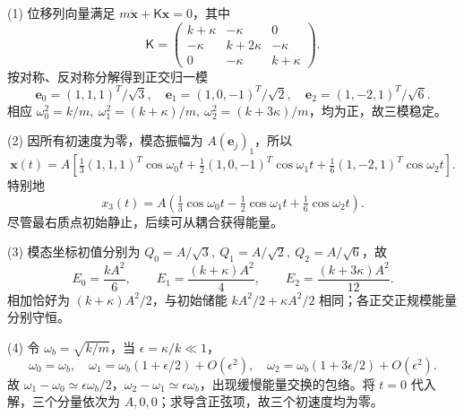 (1) 位移列向量满足 \(m\ddot{\boldsymbol x}+\mathsf K\boldsymbol x=0\)，其中
\[
\mathsf K=\begin{pmatrix}k+\kappa&-\kappa&0\\-\kappa&k+2\kappa&-\kappa\\0&-\kappa&k+\kappa\end{pmatrix}.
\]
按对称、反对称分解得到正交归一模
\[
\boldsymbol e_0=(1,1,1)^T/\sqrt3,\quad
\boldsymbol e_1=(1,0,-1)^T/\sqrt2,\quad
\boldsymbol e_2=(1,-2,1)^T/\sqrt6.
\]
相应 \(\omega_0^2=k/m,\ \omega_1^2=(k+\kappa)/m,\ \omega_2^2=(k+3\kappa)/m\)，均为正，故三模稳定。

(2) 因所有初速度为零，模态振幅为 \(A(\boldsymbol e_j)_1\)，所以
\[
\boldsymbol x(t)=A\left[\tfrac13(1,1,1)^T\cos\omega_0t+
\tfrac12(1,0,-1)^T\cos\omega_1t+
\tfrac16(1,-2,1)^T\cos\omega_2t\right].
\]
特别地
\[
x_3(t)=A\left(\tfrac13\cos\omega_0t-\tfrac12\cos\omega_1t+\tfrac16\cos\omega_2t\right).
\]
尽管最右质点初始静止，后续可从耦合获得能量。

(3) 模态坐标初值分别为 \(Q_0=A/\sqrt3,\ Q_1=A/\sqrt2,\ Q_2=A/\sqrt6\)，故
\[
E_0=\frac{kA^2}{6},\qquad E_1=\frac{(k+\kappa)A^2}{4},\qquad E_2=\frac{(k+3\kappa)A^2}{12}.
\]
相加恰好为 \((k+\kappa)A^2/2\)，与初始储能 \(kA^2/2+\kappa A^2/2\) 相同；各正交正规模能量分别守恒。

(4) 令 \(\omega_b=\sqrt{k/m}\)，当 \(\epsilon=\kappa/k\ll1\)，
\[
\omega_0=\omega_b,\quad\omega_1=\omega_b(1+\epsilon/2)+O(\epsilon^2),\quad
\omega_2=\omega_b(1+3\epsilon/2)+O(\epsilon^2).
\]
故 \(\omega_1-\omega_0\simeq\epsilon\omega_b/2\)，\(\omega_2-\omega_1\simeq\epsilon\omega_b\)，出现缓慢能量交换的包络。将 \(t=0\) 代入解，三个分量依次为 \(A,0,0\)；求导含正弦项，故三个初速度均为零。
